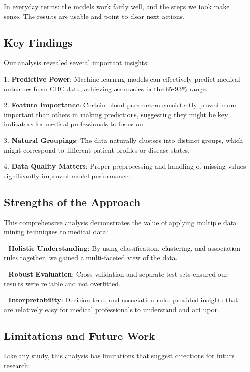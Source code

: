 \documentclass[12pt,a4paper]{article}
\begin{document}
In everyday terms: the models work fairly well, and the steps we took make sense. The results are usable and point to clear next actions.

\subsection{Key Findings}

Our analysis revealed several important insights:

1. \textbf{Predictive Power}: Machine learning models can effectively predict medical outcomes from CBC data, achieving accuracies in the 85-93\% range.

2. \textbf{Feature Importance}: Certain blood parameters consistently proved more important than others in making predictions, suggesting they might be key indicators for medical professionals to focus on.

3. \textbf{Natural Groupings}: The data naturally clusters into distinct groups, which might correspond to different patient profiles or disease states.

4. \textbf{Data Quality Matters}: Proper preprocessing and handling of missing values significantly improved model performance.

\subsection{Strengths of the Approach}

This comprehensive analysis demonstrates the value of applying multiple data mining techniques to medical data:

- \textbf{Holistic Understanding}: By using classification, clustering, and association rules together, we gained a multi-faceted view of the data.

- \textbf{Robust Evaluation}: Cross-validation and separate test sets ensured our results were reliable and not overfitted.

- \textbf{Interpretability}: Decision trees and association rules provided insights that are relatively easy for medical professionals to understand and act upon.

\subsection{Limitations and Future Work}

Like any study, this analysis has limitations that suggest directions for future research:
\end{document}
